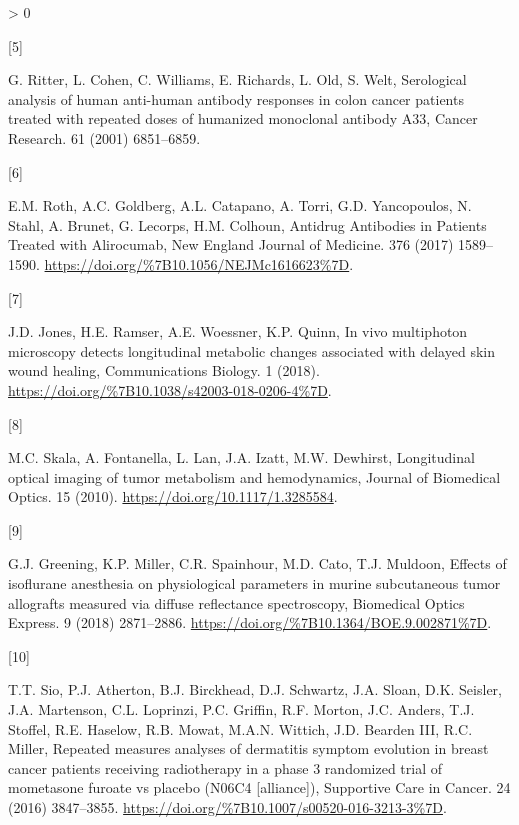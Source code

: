 \documentclass[
]{article}
\newlength{\cslhangindent}
\newlength{\csllabelwidth}
\newenvironment{CSLReferences}[2] %
 {%
  \setlength{\parindent}{0pt}
  \ifodd #1 \everypar{\setlength{\hangindent}{\cslhangindent}}\ignorespaces\fi
  \ifnum #2 > 0
  \setlength{\parskip}{#2\baselineskip}
  \fi
 }%
 {}
\newcommand{\CSLLeftMargin}[1]{\parbox[t]{\csllabelwidth}{#1}}
\newcommand{\CSLRightInline}[1]{\parbox[t]{\linewidth - \csllabelwidth}{#1}\break}
\begin{document}
\begin{CSLReferences}{0}{0}
\leavevmode\hypertarget{ref-ritter2001}{}%
\CSLLeftMargin{{[}5{]} }
\CSLRightInline{G. Ritter, L. Cohen, C. Williams, E. Richards, L. Old, S. Welt, {Serological analysis of human anti-human antibody responses in colon cancer patients treated with repeated doses of humanized monoclonal antibody A33}, {Cancer Research}. {61} (2001) 6851--6859.}

\leavevmode\hypertarget{ref-roth2017}{}%
\CSLLeftMargin{{[}6{]} }
\CSLRightInline{E.M. Roth, A.C. Goldberg, A.L. Catapano, A. Torri, G.D. Yancopoulos, N. Stahl, A. Brunet, G. Lecorps, H.M. Colhoun, {Antidrug Antibodies in Patients Treated with Alirocumab}, {New England Journal of Medicine}. {376} (2017) 1589--1590. \url{https://doi.org/\%7B10.1056/NEJMc1616623\%7D}.}

\leavevmode\hypertarget{ref-jones2018}{}%
\CSLLeftMargin{{[}7{]} }
\CSLRightInline{J.D. Jones, H.E. Ramser, A.E. Woessner, K.P. Quinn, {In vivo multiphoton microscopy detects longitudinal metabolic changes associated with delayed skin wound healing}, {Communications Biology}. {1} (2018). \url{https://doi.org/\%7B10.1038/s42003-018-0206-4\%7D}.}

\leavevmode\hypertarget{ref-skala2010}{}%
\CSLLeftMargin{{[}8{]} }
\CSLRightInline{M.C. Skala, A. Fontanella, L. Lan, J.A. Izatt, M.W. Dewhirst, Longitudinal optical imaging of tumor metabolism and hemodynamics, Journal of Biomedical Optics. 15 (2010). \url{https://doi.org/10.1117/1.3285584}.}

\leavevmode\hypertarget{ref-greening2018}{}%
\CSLLeftMargin{{[}9{]} }
\CSLRightInline{G.J. Greening, K.P. Miller, C.R. Spainhour, M.D. Cato, T.J. Muldoon, {Effects of isoflurane anesthesia on physiological parameters in murine subcutaneous tumor allografts measured via diffuse reflectance spectroscopy}, {Biomedical Optics Express}. {9} (2018) 2871--2886. \url{https://doi.org/\%7B10.1364/BOE.9.002871\%7D}.}

\leavevmode\hypertarget{ref-sio2016}{}%
\CSLLeftMargin{{[}10{]} }
\CSLRightInline{T.T. Sio, P.J. Atherton, B.J. Birckhead, D.J. Schwartz, J.A. Sloan, D.K. Seisler, J.A. Martenson, C.L. Loprinzi, P.C. Griffin, R.F. Morton, J.C. Anders, T.J. Stoffel, R.E. Haselow, R.B. Mowat, M.A.N. Wittich, J.D. Bearden III, R.C. Miller, {Repeated measures analyses of dermatitis symptom evolution in breast cancer patients receiving radiotherapy in a phase 3 randomized trial of mometasone furoate vs placebo (N06C4 {{[}}alliance{]})}, {Supportive Care in Cancer}. {24} (2016) 3847--3855. \url{https://doi.org/\%7B10.1007/s00520-016-3213-3\%7D}.}


\end{CSLReferences}
\end{document}
